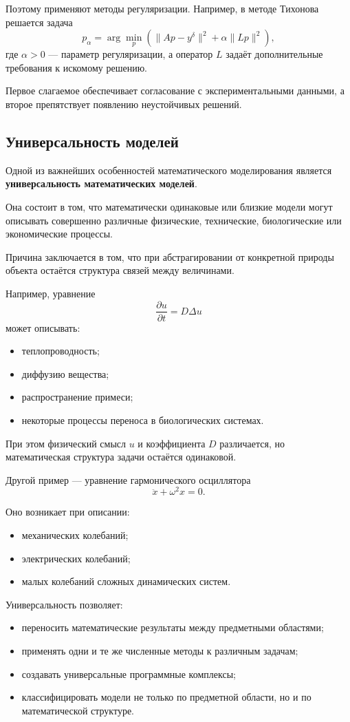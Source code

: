 Поэтому применяют методы регуляризации. Например, в методе Тихонова
решается задача
\[
p_{\alpha}
=
\arg\min_p
\left(
\|Ap-y^{\delta}\|^2
+
\alpha\|Lp\|^2
\right),
\]
где $\alpha>0$ --- параметр регуляризации, а оператор $L$ задаёт
дополнительные требования к искомому решению.

Первое слагаемое обеспечивает согласование с экспериментальными данными,
а второе препятствует появлению неустойчивых решений.


\subsection{Универсальность моделей}

Одной из важнейших особенностей математического моделирования является
\textbf{универсальность математических моделей}.

Она состоит в том, что математически одинаковые или близкие модели могут
описывать совершенно различные физические, технические, биологические
или экономические процессы.

Причина заключается в том, что при абстрагировании от конкретной природы
объекта остаётся структура связей между величинами.

Например, уравнение
\[
\frac{\partial u}{\partial t}
=
D\Delta u
\]
может описывать:
\begin{itemize}
	\item теплопроводность;
	\item диффузию вещества;
	\item распространение примеси;
	\item некоторые процессы переноса в биологических системах.
\end{itemize}

При этом физический смысл $u$ и коэффициента $D$ различается,
но математическая структура задачи остаётся одинаковой.

Другой пример --- уравнение гармонического осциллятора
\[
\ddot{x}+\omega^2x=0.
\]

Оно возникает при описании:
\begin{itemize}
	\item механических колебаний;
	\item электрических колебаний;
	\item малых колебаний сложных динамических систем.
\end{itemize}

Универсальность позволяет:
\begin{itemize}
	\item переносить математические результаты между предметными областями;
	\item применять одни и те же численные методы к различным задачам;
	\item создавать универсальные программные комплексы;
	\item классифицировать модели не только по предметной области,
	но и по математической структуре.
\end{itemize}

